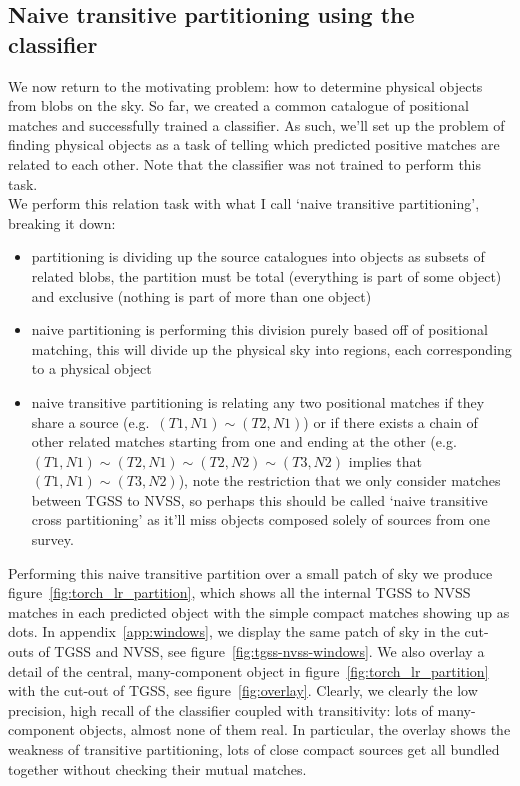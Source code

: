 \documentclass[12pt,a4paper]{article}
\begin{document}
\newpage
\subsection{Naive transitive partitioning using the classifier}
We now return to the motivating problem: how to determine physical objects from blobs on the sky. So far, we created a common catalogue of positional matches and successfully trained a classifier. As such, we'll set up the problem of finding physical objects as a task of telling which predicted positive matches are related to each other. Note that the classifier was not trained to perform this task. \\

We perform this relation task with what I call `naive transitive partitioning', breaking it down:
\begin{itemize}
    \item partitioning is dividing up the source catalogues into objects as subsets of related blobs, the partition must be total (everything is part of some object) and exclusive (nothing is part of more than one object)
    \item naive partitioning is performing this division purely based off of positional matching, this will divide up the physical sky into regions, each corresponding to a physical object
    \item naive transitive partitioning is relating any two positional matches if they share a source (e.g.\ $(T1,N1) \sim (T2,N1)$) or if there exists a chain of other related matches starting from one and ending at the other (e.g.\ $(T1,N1) \sim (T2,N1) \sim (T2,N2) \sim (T3,N2)$ implies that $(T1,N1) \sim (T3,N2)$), note the restriction that we only consider matches between TGSS to NVSS, so perhaps this should be called `naive transitive cross partitioning' as it'll miss objects composed solely of sources from one survey.
\end{itemize}
Performing this naive transitive partition over a small patch of sky we produce figure~\ref{fig:torch_lr_partition}, which shows all the internal TGSS to NVSS matches in each predicted object with the simple compact matches showing up as dots. In appendix~\ref{app:windows}, we display the same patch of sky in the cut-outs of TGSS and NVSS, see figure~\ref{fig:tgss-nvss-windows}. We also overlay a detail of the central, many-component object in figure~\ref{fig:torch_lr_partition} with the cut-out of TGSS, see figure~\ref{fig:overlay}. Clearly, we clearly the low precision, high recall of the classifier coupled with transitivity: lots of many-component objects, almost none of them real. In particular, the overlay shows the weakness of transitive partitioning, lots of close compact sources get all bundled together without checking their mutual matches.\\
\end{document}
